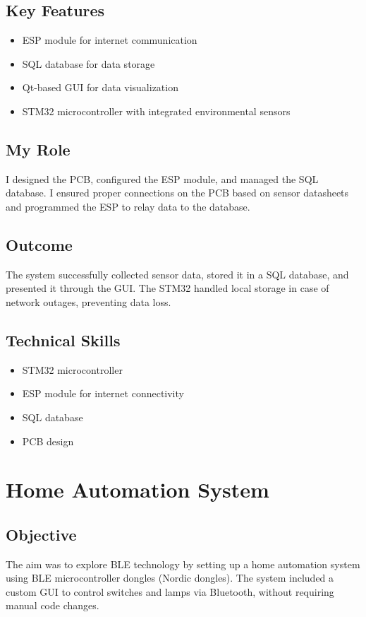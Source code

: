 \documentclass{article}
\begin{document}
\subsection{Key Features}
\begin{itemize}
    \item ESP module for internet communication
    \item SQL database for data storage
    \item Qt-based GUI for data visualization
    \item STM32 microcontroller with integrated environmental sensors
\end{itemize}

\subsection{My Role}
I designed the PCB, configured the ESP module, and managed the SQL database. I ensured proper connections on the PCB based on sensor datasheets and programmed the ESP to relay data to the database.

\subsection{Outcome}
The system successfully collected sensor data, stored it in a SQL database, and presented it through the GUI. The STM32 handled local storage in case of network outages, preventing data loss.

\subsection{Technical Skills}
\begin{itemize}
    \item STM32 microcontroller
    \item ESP module for internet connectivity
    \item SQL database
    \item PCB design
\end{itemize}

\section{Home Automation System}
\subsection{Objective}
The aim was to explore BLE technology by setting up a home automation system using BLE microcontroller dongles (Nordic dongles). The system included a custom GUI to control switches and lamps via Bluetooth, without requiring manual code changes.
\end{document}
